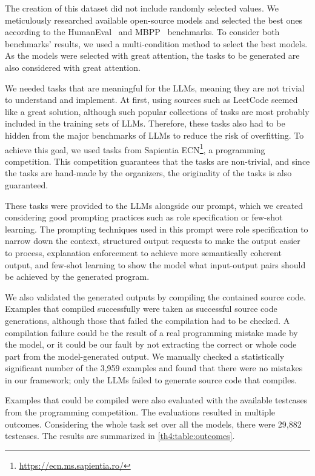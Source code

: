 \documentclass[12pt,a4paper]{extarticle}
\begin{document}
The creation of this dataset did not include randomly selected values.
We meticulously researched available open-source models and selected the best ones according to the HumanEval~\cite{codex} and MBPP~\cite{mbpp} benchmarks.
To consider both benchmarks' results, we used a multi-condition method to select the best models.
As the models were selected with great attention, the tasks to be generated are also considered with great attention.

We needed tasks that are  meaningful for the LLMs, meaning they are not trivial to understand and implement.
At first, using sources such as LeetCode seemed like a great solution, although such popular collections of tasks are most probably included in the training sets of LLMs.
Therefore, these tasks also had to be hidden from the major benchmarks of LLMs to reduce the risk of overfitting.
To achieve this goal, we used tasks from Sapientia ECN\footnote{\url{https://ecn.ms.sapientia.ro/}}, a programming competition.
This competition guarantees that the tasks are non-trivial, and since the tasks are hand-made by the organizers, the originality of the tasks is also guaranteed.

These tasks were provided to the LLMs alongside our prompt, which we created considering good prompting practices such as role specification or few-shot learning.
The prompting techniques used in this prompt were role specification to narrow down the context, structured output requests to make the output easier to process, explanation enforcement to achieve more semantically coherent output, and few-shot learning to show the model what input-output pairs should be achieved by the generated program.

We also validated the generated outputs by compiling the contained source code.
Examples that compiled successfully were taken as successful source code generations, although those that failed the compilation had to be checked.
A compilation failure could be the result of a real programming mistake made by the model, or it could be our fault by not extracting the correct or whole code part from the model-generated output.
We manually checked a statistically significant number of the 3,959 examples and found that there were no mistakes in our framework; only the LLMs failed to generate source code that compiles.

Examples that could be compiled were also evaluated with the available testcases from the programming competition.
The evaluations resulted in multiple outcomes.
Considering the whole task set over all the models, there were 29,882 testcases.
The results are summarized in \autoref{th4:table:outcomes}.
\end{document}

